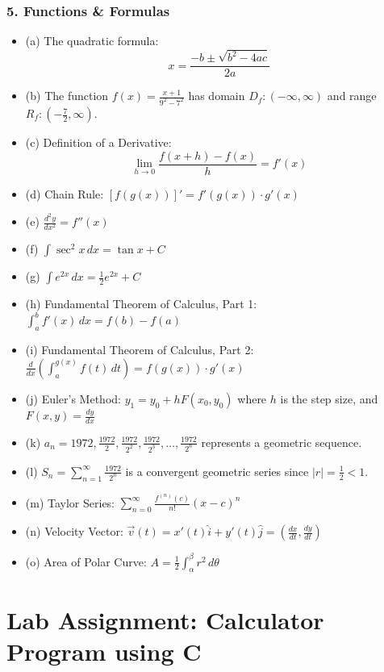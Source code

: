 \documentclass[a4paper,15pt]{article}
\begin{document}
\subsubsection*{5. Functions \& Formulas}
\begin{itemize}
    \item (a) The quadratic formula:
    \[
    x = \frac{-b \pm \sqrt{b^2 - 4ac}}{2a}
    \]
    \item (b) The function \(f(x) = \frac{x + 1}{9^2 - 7^2}\) has domain \(D_f : (-\infty, \infty)\) and range \(R_f : \left(-\frac{7}{2}, \infty\right)\).
    \item (c) Definition of a Derivative:
    \[
    \lim_{h \to 0} \frac{f(x + h) - f(x)}{h} = f'(x)
    \]
    \item (d) Chain Rule: \([f(g(x))]' = f'(g(x)) \cdot g'(x)\)
    \item (e) \(\frac{d^2y}{dx^2} = f''(x)\)
    \item (f) \(\int \sec^2 x \, dx = \tan x + C\)
    \item (g) \(\int e^{2x} \, dx = \frac{1}{2}e^{2x} + C\)
    \item (h) Fundamental Theorem of Calculus, Part 1: \(\int_a^b f'(x) \, dx = f(b) - f(a)\)
    \item (i) Fundamental Theorem of Calculus, Part 2: \(\frac{d}{dx} \left( \int_a^{g(x)} f(t) \, dt \right) = f(g(x)) \cdot g'(x)\)
    \item (j) Euler’s Method: \(y_1 = y_0 + hF(x_0, y_0)\) where \(h\) is the step size, and \(F(x, y) = \frac{dy}{dx}\)
    \item (k) \(a_n = 1972, \frac{1972}{2}, \frac{1972}{2^2}, \frac{1972}{2^3}, \ldots, \frac{1972}{2^n}\) represents a geometric sequence.
    \item (l) \(S_n = \sum_{n=1}^{\infty} \frac{1972}{2^n}\) is a convergent geometric series since \(|r| = \frac{1}{2} < 1\).
    \item (m) Taylor Series: \(\sum_{n=0}^{\infty} \frac{f^{(n)}(c)}{n!} (x - c)^n\)
    \item (n) Velocity Vector: \(\vec{v}(t) = x'(t)\hat{i} + y'(t)\hat{j} = \left(\frac{dx}{dt}, \frac{dy}{dt}\right)\)
    \item (o) Area of Polar Curve: \(A = \frac{1}{2} \int_\alpha^\beta r^2 \, d\theta\)
\end{itemize}
\section{Lab Assignment: Calculator Program using C}
\end{document}
